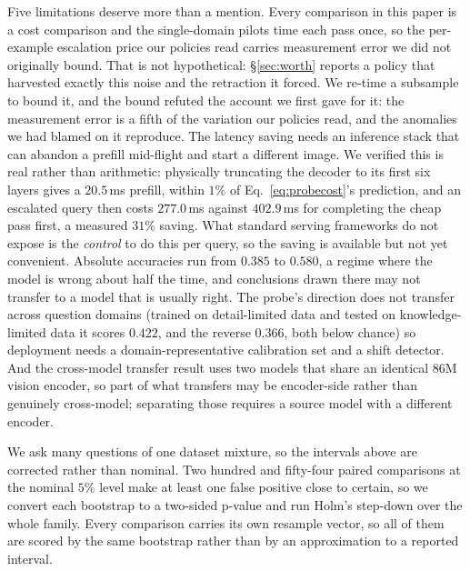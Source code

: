 \documentclass[10pt,twocolumn]{article}
\theoremstyle{plain}
\begin{document}
Five limitations deserve more than a mention. Every comparison in this paper
is a cost comparison and the single-domain pilots time each pass once, so the
per-example escalation price our policies read carries measurement error we did
not originally bound. That is not hypothetical: \S\ref{sec:worth} reports a
policy that harvested exactly this noise and the retraction it forced. We
re-time a subsample to bound it, and the bound refuted the account we first
gave for it: the measurement error is a fifth of the variation our policies
read, and the anomalies we had blamed on it reproduce. The latency saving
needs an
inference stack that can abandon a prefill mid-flight and start a different
image. We verified this is real rather than arithmetic: physically truncating
the decoder to its first six layers gives a $20.5$\,ms prefill, within $1\%$ of Eq.~\ref{eq:probecost}'s prediction, and an escalated query then costs
$277.0$\,ms against $402.9$\,ms for completing the cheap pass first, a measured
$31\%$ saving. What standard serving frameworks do not expose is the
\emph{control} to do this per query, so the saving is available but not yet
convenient. Absolute accuracies run from
$0.385$ to $0.580$, a regime where the model is wrong about half the time, and
conclusions drawn there may not transfer to a model that is usually right. The
probe's direction does not transfer across question domains (trained on detail-limited data and tested on knowledge-limited data it scores $0.422$, and the reverse $0.366$, both below chance) so deployment needs a
domain-representative calibration set and a shift detector. And the cross-model
transfer result uses two models that share an identical $86$M vision encoder,
so part of what transfers may be encoder-side rather than genuinely
cross-model; separating those requires a source model with a different encoder.

We ask many questions of one dataset mixture, so the intervals above are
corrected rather than nominal. Two hundred and fifty-four paired
comparisons at the nominal $5\%$ level make at least one false positive close
to certain, so we convert
each bootstrap to a two-sided p-value and run Holm's step-down over the whole
family. Every comparison carries its own resample vector, so all of them are
scored by the same bootstrap rather than by an approximation to a reported
interval.
\end{document}
